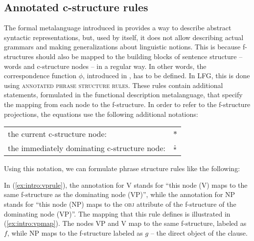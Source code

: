 \documentclass[output=paper]{langscibook}
\begin{document}
 \subsection{Annotated c-structure rules\label{sect:intro:annotated}}
 
 The formal metalanguage introduced in  provides a way to describe abstract syntactic representations, but, used by itself, it does not allow describing actual grammars and making generalizations about linguistic notions. This is because f-structures should also be mapped to the building blocks of sentence structure -- words and c-structure nodes -- in a regular way. In other words, the correspondence function $\phi$, introduced in , has to be defined. In LFG, this is done using \textsc{annotated phrase structure rules}. These rules contain additional statements, formulated in the functional description metalanguage, that specify the mapping from each node to the f-structure. In order to refer to the f-structure projections, the equations use the following additional notations:
 
 \eas
 \begin{tabular}[t]{ll}
  the current c-structure node: & $*$\\
  the immediately dominating c-structure node: & $\hbox{$\hat{\ast}$}$\\
 \end{tabular}
 \zs
Using this notation, we can formulate phrase structure rules like the following:
 
 \ea\label{ex:intro:vprule}
 \z
In (\ref{ex:intro:vprule}), the annotation for V stands for ``this node (V) maps to the same f-structure as the dominating node (VP)'', while the annotation for NP stands for ``this node (NP) maps to the \textsc{obj} attribute of the f-structure of the dominating node (VP)''. The mapping that this rule defines is illustrated in (\ref{ex:intro:vpmap}). The nodes VP and V map to the same f-structure, labeled as $f$, while NP maps to the f-structure labeled as $g$ -- the direct object of the clause.
 
\end{document}
